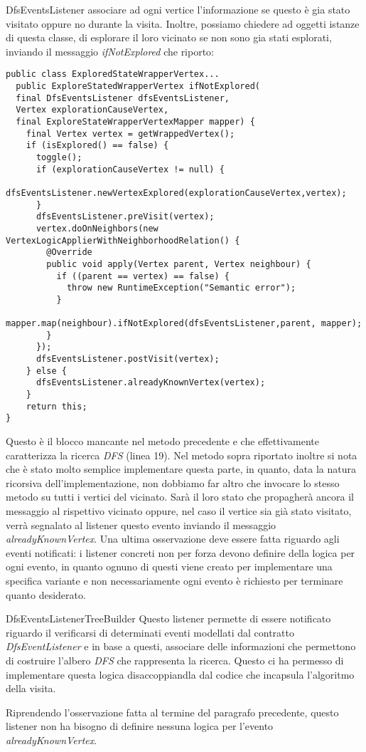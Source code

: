 \begin{paragraph}{DfsEventsListener}
associare ad ogni vertice l'informazione se questo \`e gia stato
visitato oppure no durante la visita. Inoltre, possiamo chiedere ad
oggetti istanze di questa classe, di esplorare il loro vicinato se non
sono gia stati esplorati, inviando il messaggio \emph{ifNotExplored}
che riporto:
\begin{lstlisting}
public class ExploredStateWrapperVertex...
  public ExploreStatedWrapperVertex ifNotExplored(
  final DfsEventsListener dfsEventsListener,
  Vertex explorationCauseVertex,
  final ExploreStateWrapperVertexMapper mapper) {
    final Vertex vertex = getWrappedVertex();
    if (isExplored() == false) {
      toggle();
      if (explorationCauseVertex != null) {
        dfsEventsListener.newVertexExplored(explorationCauseVertex,vertex);
      }
      dfsEventsListener.preVisit(vertex);
      vertex.doOnNeighbors(new VertexLogicApplierWithNeighborhoodRelation() {
        @Override
        public void apply(Vertex parent, Vertex neighbour) {
          if ((parent == vertex) == false) {
            throw new RuntimeException("Semantic error");
          }
          mapper.map(neighbour).ifNotExplored(dfsEventsListener,parent, mapper);
        }
      });
      dfsEventsListener.postVisit(vertex);
    } else {
      dfsEventsListener.alreadyKnownVertex(vertex);
    }
    return this;
}
\end{lstlisting}
Questo \`e il blocco mancante nel metodo precedente e che
effettivamente caratterizza la ricerca \emph{DFS} (linea 19). Nel
metodo sopra riportato inoltre si nota che \`e stato molto semplice
implementare questa parte, in quanto, data la natura ricorsiva
dell'implementazione, non dobbiamo far altro che invocare lo stesso
metodo su tutti i vertici del vicinato. Sar\`a il loro stato che
propagher\`a ancora il messaggio al rispettivo vicinato oppure, nel
caso il vertice sia gi\`a stato visitato, verr\`a segnalato al
listener questo evento inviando il messaggio
\emph{alreadyKnownVertex}. Una ultima osservazione deve essere fatta
riguardo agli eventi notificati: i listener concreti non per forza
devono definire della logica per ogni evento, in quanto ognuno di
questi viene creato per implementare una specifica variante e non
necessariamente ogni evento \`e richiesto per terminare quanto
desiderato.
\end{paragraph}

\begin{paragraph}{DfsEventsListenerTreeBuilder}
  Questo listener permette di essere notificato riguardo il
  verificarsi di determinati eventi modellati dal contratto
  \emph{DfsEventListener} e in base a questi, associare delle
  informazioni che permettono di costruire l'albero \emph{DFS} che
  rappresenta la ricerca. Questo ci ha permesso di implementare questa
  logica disaccoppiandla dal codice che incapsula l'algoritmo della
  visita. 

  Riprendendo l'osservazione fatta al termine del paragrafo
  precedente, questo listener non ha bisogno di definire nessuna
  logica per l'evento \emph{alreadyKnownVertex}.
\end{paragraph}

